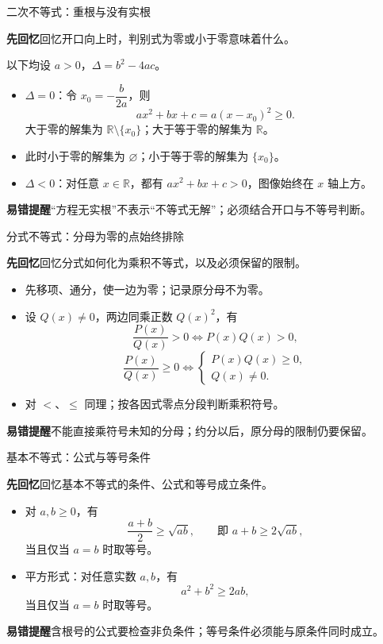 \documentclass[UTF8,10pt,aspectratio=169,handout]{ctexbeamer}
\newcommand{\Recall}[1]{\par\noindent\textcolor{KnowledgeBlue}{\textbf{先回忆}\quad #1}\par\vspace{0.3cm}}
\newcommand{\Pitfall}[1]{\par\vspace{0.22cm}\noindent\textbf{易错提醒}\quad #1\par}
\begin{document}
\begin{frame}[t]{二次不等式：重根与没有实根}
\large
\Recall{回忆开口向上时，判别式为零或小于零意味着什么。}
\pause
以下均设 $a>0$，$\Delta=b^2-4ac$。
\begin{itemize}
  \item $\Delta=0$：令 $x_0=-\dfrac{b}{2a}$，则
  \[ax^2+bx+c=a(x-x_0)^2\ge0.\]
  大于零的解集为 $\mathbb R\setminus\{x_0\}$；大于等于零的解集为 $\mathbb R$。
  \item 此时小于零的解集为 $\varnothing$；小于等于零的解集为 $\{x_0\}$。
  \item $\Delta<0$：对任意 $x\in\mathbb R$，都有 $ax^2+bx+c>0$，图像始终在 $x$ 轴上方。
\end{itemize}
\Pitfall{“方程无实根”不表示“不等式无解”；必须结合开口与不等号判断。}
\end{frame}

\begin{frame}[t]{分式不等式：分母为零的点始终排除}
\large
\Recall{回忆分式如何化为乘积不等式，以及必须保留的限制。}
\pause
\begin{itemize}
  \item 先移项、通分，使一边为零；记录原分母不为零。
  \item 设 $Q(x)\ne0$，两边同乘正数 $Q(x)^2$，有
  \[
  \frac{P(x)}{Q(x)}>0\iff P(x)Q(x)>0,
  \]
  \[
  \frac{P(x)}{Q(x)}\ge0\iff
  \begin{cases}P(x)Q(x)\ge0,\\Q(x)\ne0.\end{cases}
  \]
  \item 对 $<$、$\le$ 同理；按各因式零点分段判断乘积符号。
\end{itemize}
\Pitfall{不能直接乘符号未知的分母；约分以后，原分母的限制仍要保留。}
\end{frame}

\begin{frame}[t]{基本不等式：公式与等号条件}
\large
\Recall{回忆基本不等式的条件、公式和等号成立条件。}
\pause
\begin{itemize}
  \item 对 $a,b\ge0$，有
  \[\frac{a+b}{2}\ge\sqrt{ab},\qquad\text{即 }a+b\ge2\sqrt{ab},\]
  当且仅当 $a=b$ 时取等号。
  \item 平方形式：对任意实数 $a,b$，有
  \[a^2+b^2\ge2ab,\]
  当且仅当 $a=b$ 时取等号。
\end{itemize}
\Pitfall{含根号的公式要检查非负条件；等号条件必须能与原条件同时成立。}
\end{frame}
\end{document}
